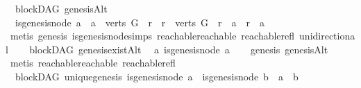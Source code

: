 \begin{isabellebody}
\ {\isacharparenleft}{\kern0pt}\ blockDAG{\isacharparenright}{\kern0pt}\ genesisAlt{}\ {\isacharcolon}{\kern0pt}\isanewline
\ \ {\isachardoublequoteopen}{\isacharparenleft}{\kern0pt}is{\isacharunderscore}{\kern0pt}genesis{\isacharunderscore}{\kern0pt}node\ a{\isacharparenright}{\kern0pt}\ {\isasymlongleftrightarrow}\ {\isacharparenleft}{\kern0pt}{\isacharparenleft}{\kern0pt}a\ {\isasymin}\ verts\ G{\isacharparenright}{\kern0pt}\ {\isasymand}\ {\isacharparenleft}{\kern0pt}{\isasymforall}r{\isachardot}{\kern0pt}\ \ {\isacharparenleft}{\kern0pt}r\ {\isasymin}\ verts\ G{\isacharparenright}{\kern0pt}\ {\isasymlongrightarrow}\ r\ {\isasymrightarrow}\isactrlsup {\isacharplus}{\kern0pt}\ a\ {\isasymor}\ r\ {\isacharequal}{\kern0pt}\ a{\isacharparenright}{\kern0pt}{\isacharparenright}{\kern0pt}{\isachardoublequoteclose}\isanewline
%
\isadelimproof
\ \ %
\endisadelimproof
%
\isatagproof
{}\isamarkupfalse%
\ {\isacharparenleft}{\kern0pt}metis\ genesis\ is{\isacharunderscore}{\kern0pt}genesis{\isacharunderscore}{\kern0pt}node{\isachardot}{\kern0pt}simps\ reachable{}{\isacharunderscore}{\kern0pt}reachable\ reachable{\isacharunderscore}{\kern0pt}refl\ unidirectional{\isacharparenright}{\kern0pt}%
\endisatagproof
{\isafoldproof}%
%
\isadelimproof
\ \isanewline
%
\endisadelimproof
\isanewline
{}\isamarkupfalse%
\ {\isacharparenleft}{\kern0pt}\ blockDAG{\isacharparenright}{\kern0pt}\ genesis{\isacharunderscore}{\kern0pt}existAlt{\isacharcolon}{\kern0pt}\isanewline
\ \ {\isachardoublequoteopen}{\isasymexists}a{\isachardot}{\kern0pt}\ is{\isacharunderscore}{\kern0pt}genesis{\isacharunderscore}{\kern0pt}node\ a{\isachardoublequoteclose}\isanewline
%
\isadelimproof
\ \ %
\endisadelimproof
%
\isatagproof
{}\isamarkupfalse%
\ genesis\ genesisAlt\isanewline
\ \ \isamarkupfalse%
\ {\isacharparenleft}{\kern0pt}metis\ reachable{}{\isacharunderscore}{\kern0pt}reachable\ reachable{\isacharunderscore}{\kern0pt}refl{\isacharparenright}{\kern0pt}%
\endisatagproof
{\isafoldproof}%
%
\isadelimproof
\ \ \isanewline
%
\endisadelimproof
\isanewline
{}\isamarkupfalse%
\ {\isacharparenleft}{\kern0pt}\ blockDAG{\isacharparenright}{\kern0pt}\ unique{\isacharunderscore}{\kern0pt}genesis{\isacharcolon}{\kern0pt}\ {\isachardoublequoteopen}is{\isacharunderscore}{\kern0pt}genesis{\isacharunderscore}{\kern0pt}node\ a\ {\isasymand}\ is{\isacharunderscore}{\kern0pt}genesis{\isacharunderscore}{\kern0pt}node\ b\ {\isasymlongrightarrow}\ a\ {\isacharequal}{\kern0pt}\ b{\isachardoublequoteclose}\isanewline

\end{isabellebody}

